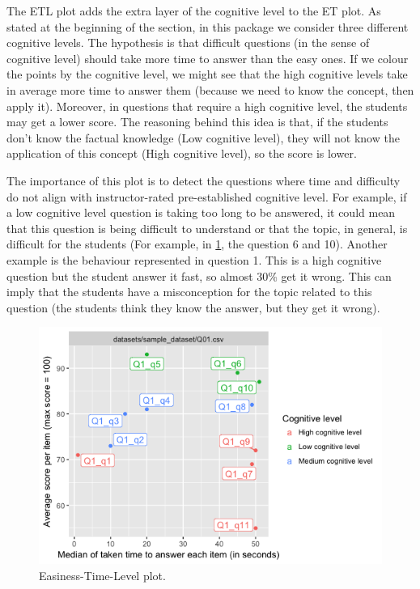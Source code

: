 The ETL plot \cite{Stefan2015b} adds the extra layer of the cognitive level to the ET plot. As stated at the beginning of the section, in this package we consider three different cognitive levels. The hypothesis is that difficult questions (in the sense of cognitive level) should take more time to answer than the easy ones. If we colour the points by the cognitive level, we might see that the high cognitive levels take in average more time to answer them (because we need to know the concept, then apply it). Moreover, in questions that require a high cognitive level, the students may get a lower score. The reasoning behind this idea is that, if the students don't know the factual knowledge (Low cognitive level), they will not know the application of this concept (High cognitive level), so the score is lower. 

The importance of this plot is to detect the questions where time and difficulty do not align with instructor-rated pre-established cognitive level. For example, if a low cognitive level question is taking too long to be answered, it could mean that this question is being difficult to understand or that the topic, in general, is difficult for the students (For example, in \cref{img:quiz_etl}, the question 6 and 10). Another example is the behaviour represented in question 1. This is a high cognitive question but the student answer it fast, so almost 30\% get it wrong. This can imply that the students have a misconception for the topic related to this question (the students think they know the answer, but they get it wrong). 

\begin{figure}[ht!]
  \centering
  \includegraphics[width=.8\linewidth]{img/quiz_etl.png}
  \caption{Easiness-Time-Level plot.}
  \label{img:quiz_etl}
\end{figure}


